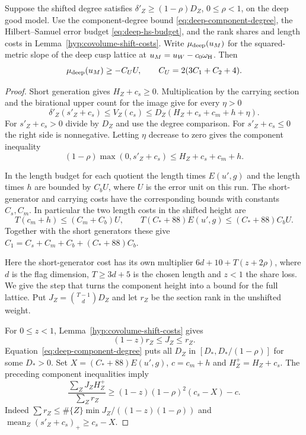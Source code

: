 \begin{lemma}
Suppose the shifted degree satisfies
\(\delta'_Z\ge(1-\rho)D_Z\), \(0\le\rho<1\), on the deep good model.
Use the component-degree bound \eqref{eq:deep-component-degree}, the
Hilbert--Samuel error budget \eqref{eq:deep-hs-budget}, and the
rank shares and length costs in Lemma~\ref{hyp:covolume-shift-costs}.
Write \(\mu_{\rm deep}(u_M)\) for the squared-metric slope of the deep cusp lattice at \(u_M=u_W-c_0\omega_{\rm H}\). Then
\[
 \mu_{\rm deep}(u_M)\ge-C_U U,\qquad C_U=2(3C_1+C_2+4).
\]

\end{lemma}
\begin{proof}
Short generation gives \(H_Z+c_s\ge0\). Multiplication by the
carrying section and the birational upper count for the image give
for every \(\eta>0\)
\[
 \delta'_Z(s'_Z+c_s)\le V_Z(c_s)
 \le D_Z(H_Z+c_s+c_m+h+\eta).
\]
For \(s'_Z+c_s>0\) divide by \(D_Z\) and use the degree
comparison. For \(s'_Z+c_s\le0\) the right side is nonnegative.
Letting \(\eta\) decrease to zero gives the component inequality
\[
 (1-\rho)\max(0,s'_Z+c_s)\le H_Z+c_s+c_m+h .
\]

In the length budget for each quotient the length times
\(E(u',g)\) and the length times \(h\) are bounded by
\(C_b U\), where \(U\) is the error unit on this run.
The short-generator and carrying costs have the corresponding
bounds with constants \(C_s,C_m\). In particular the two length costs in the shifted height are
\[
 T(c_m+h)\le(C_m+C_b)U,\qquad
 T(C_*+88)E(u',g)\le(C_*+88)C_b U.
\]
Together with the short generators these give
\(C_1=C_s+C_m+C_b+(C_*+88)C_b\).
\label{cor:covolume-component-transfer-8}

Here the short-generator cost has its own multiplier
\(6d+10+T(z+2\rho)\), where \(d\) is the flag dimension,
\(T\ge3d+5\) is the chosen length and \(z<1\) the share
loss. We give the step that turns the component height into
a bound for the full lattice. Put
\(J_Z=\binom{T-1}{d} D_Z\) and let \(r_Z\) be the section
rank in the unshifted weight.

For \(0\le z<1\), Lemma~\ref{hyp:covolume-shift-costs} gives
\[
                    (1-z)r_Z\le J_Z\le r_Z .
\]
Equation~\eqref{eq:deep-component-degree} puts all \(D_Z\) in
\([D_*,D_* /(1-\rho)]\) for some \(D_*>0\).
Set \(X=(C_*+88)E(u',g)\), \(c=c_m+h\) and
\(H_Z^+=H_Z+c_s\). The preceding component inequalities imply
\[
 \frac{\sum_Z J_Z H_Z^+}{\sum_Z r_Z}
 \ge (1-z)(1-\rho)^2(c_s-X)-c .
\]
Indeed \(\sum r_Z\le \#\{Z\}\min J_Z/((1-z)(1-\rho))\) and
\(\operatorname{mean}_Z(s'_Z+c_s)_+\ge c_s-X\).


\end{proof}
